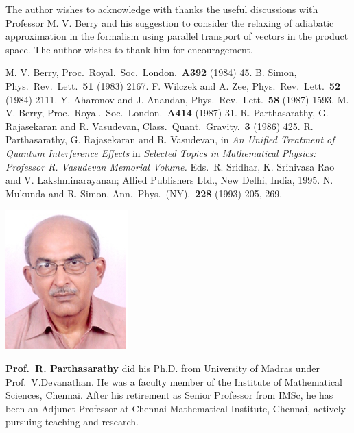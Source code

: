 The author wishes to acknowledge with thanks the useful discussions with Professor M. V. Berry and his suggestion 
to consider the relaxing of adiabatic approximation in the formalism using parallel transport of vectors in the 
product space. The author wishes to thank him for encouragement.  

\begin{thebibliography}{99}
 M. V. Berry, Proc.\ Royal.\ Soc.\ London.\ {\bf{A392}} (1984) 45.
 B. Simon, Phys.\ Rev.\ Lett.\ {\bf 51} (1983) 2167.
 F. Wilczek and A. Zee, Phys.\ Rev.\ Lett.\ {\bf 52} (1984) 2111.
 Y. Aharonov and J. Anandan, Phys.\ Rev.\ Lett.\ {\bf 58} (1987) 1593.
 M. V. Berry, Proc.\ Royal.\ Soc.\ London.\ {\bf A414} (1987) 31.  
 R. Parthasarathy, G. Rajasekaran and R. Vasudevan, Class.\ Quant.\ Gravity.\ {\bf 3} (1986) 425.
 R. Parthasarathy, G. Rajasekaran and R. Vasudevan, in {\textit{An Unified Treatment of Quantum Interference Effects}} in \textit{Selected Topics in Mathematical Physics: Professor R. Vasudevan Memorial Volume.} Eds.\ R. Sridhar, K. Srinivasa Rao and V. Lakshminarayanan; Allied Publishers Ltd., New Delhi, India, 1995.
 N. Mukunda and R. Simon, Ann.\ Phys.\ (NY).\ {\bf 228} (1993) 205, 269.
\end{thebibliography}
\drawline
\bigskip
\bigskip

\centerline{\includegraphics[scale=1.8]{authorsphotos/Prof_R_Parthasarathy.eps}}
\bigskip

\noindent
{\biofntsize\textbf{Prof.\ R. Parthasarathy} did his Ph.D. from University of Madras under Prof.\ V.Devanathan. He was a faculty member of the Institute of Mathematical Sciences, Chennai. After his retirement as Senior Professor from IMSc, he has been an Adjunct Professor at Chennai Mathematical Institute, Chennai, actively pursuing teaching and research.}




